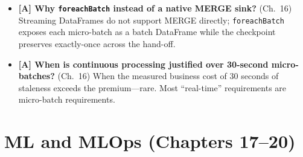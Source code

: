 \begin{itemize}
    per-partition sustainable throughput, times headroom---measured, then rounded up, because
    partitions only ever get added.
    \item \textbf{[A] Why \texttt{foreachBatch} instead of a native MERGE sink?} (Ch.~16)
    Streaming DataFrames do not support MERGE directly; \texttt{foreachBatch} exposes each
    micro-batch as a batch DataFrame while the checkpoint preserves exactly-once across the
    hand-off.
    \item \textbf{[A] When is continuous processing justified over 30-second micro-batches?}
    (Ch.~16) When the measured business cost of 30 seconds of staleness exceeds the
    premium---rare. Most ``real-time'' requirements are micro-batch requirements.
\end{itemize}

\section{ML and MLOps (Chapters 17--20)}
%
